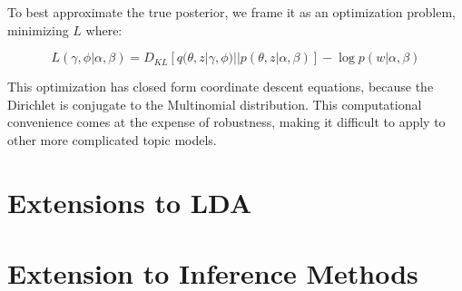\documentclass[letterpaper]{article}
\begin{document}
To best approximate the true posterior, we frame it as an optimization
problem, minimizing $L$ where:

\begin{equation}
L(\gamma, \phi | \alpha, \beta) = D_{KL}\left[ q(\theta, z | \gamma,
  \phi) || p(\theta, z | \alpha, \beta) \right] - \log p(w | \alpha, \beta)
\end{equation}

This optimization has closed form coordinate descent equations,
because the Dirichlet is conjugate to the Multinomial distribution.
This computational convenience comes at the expense of robustness,
making it difficult to apply to other more complicated topic models.

\section{Extensions to LDA}
\label{sec:ext:LDA}


\section{Extension to Inference Methods}
\label{sec:ext:inference}


\end{document}
